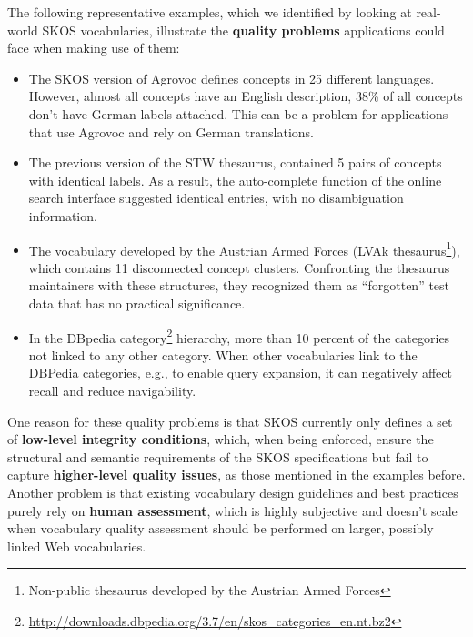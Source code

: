 \documentclass{llncs}
\begin{document}
The following representative examples, which we identified by looking at real-world SKOS vocabularies, illustrate the \textbf{quality problems} applications could face when making use of them:
\begin{itemize}
	\item The SKOS version of Agrovoc defines concepts in 25 different languages. However, almost all concepts have an English description, 38\% of all concepts don’t have German labels attached. This can be a problem for applications that use Agrovoc and rely on German translations.

	\item The previous version of the STW thesaurus, contained 5 pairs of concepts with identical labels. As a result, the auto-complete function of the online search interface suggested identical entries, with no disambiguation information.

	\item The vocabulary developed by the Austrian Armed Forces (LVAk thesaurus\footnote{Non-public thesaurus developed by the Austrian Armed Forces}), which contains 11 disconnected concept clusters. Confronting the thesaurus maintainers with these structures, they recognized them as “forgotten” test data that has no practical significance.

	\item In the DBpedia category\footnote{\url{http://downloads.dbpedia.org/3.7/en/skos_categories_en.nt.bz2}} hierarchy, more than 10 percent of the categories not linked to any other category. When other vocabularies link to the DBPedia categories, e.g., to enable query expansion, it can negatively affect recall and reduce navigability.
\end{itemize}

One reason for these quality problems is that SKOS currently only defines a set of \textbf{low-level integrity conditions}, which, when being enforced, ensure the structural and semantic requirements of the SKOS specifications but fail to capture \textbf{higher-level quality issues}, as those mentioned in the examples before. Another problem is that existing vocabulary design guidelines and best practices purely rely on \textbf{human assessment}, which is highly subjective and doesn’t scale when vocabulary quality assessment should be performed on larger, possibly linked Web vocabularies.
\end{document}

